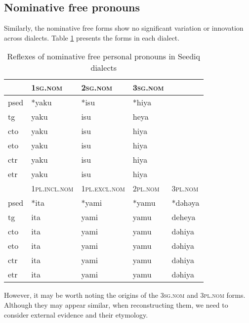 \subsection{Nominative free pronouns}

Similarly, the nominative free forms show no significant variation or innovation across dialects. Table \ref{tab:nomfree} presents the forms in each dialect.

\begin{table}[!htbp]
\centering
\caption{Reflexes of nominative free personal pronouns in Seediq dialects}
\label{tab:nomfree}
\begin{tabular}{lllll}
\hline
      & \textsc{1sg.nom}      & \textsc{2sg.nom}      & \textsc{3sg.nom} &         \\ \hline
\acs{psed} & *yaku        & *isu         & *hiya   &         \\
\acs{tg}  & yaku         & isu          & heya    &         \\
\acs{cto}  & yaku         & isu          & hiya    &         \\
\acs{eto}  & yaku         & isu          & hiya    &         \\
\acs{ctr} & yaku         & isu          & hiya    &         \\
\acs{etr} & yaku         & isu          & hiya    &         \\ \hline
      & \textsc{1pl.incl.nom} & \textsc{1pl.excl.nom} & \textsc{2pl.nom} & \textsc{3pl.nom} \\ \hline
\acs{psed} & *ita         & *yami        & *yamu   & *dəhəya \\
\acs{tg}  & ita          & yami         & yamu    & deheya  \\
\acs{cto}  & ita          & yami         & yamu    & dəhiya  \\
\acs{eto}  & ita          & yami         & yamu    & dəhiya  \\
\acs{ctr} & ita          & yami         & yamu    & dəhiya  \\
\acs{etr} & ita          & yami         & yamu    & dəhiya  \\ \hline
\end{tabular}
\end{table}

However, it may be worth noting the origins of the \textsc{3sg.nom} and \textsc{3pl.nom} forms. Although they may appear similar, when reconstructing them, we need to consider external evidence and their etymology.


